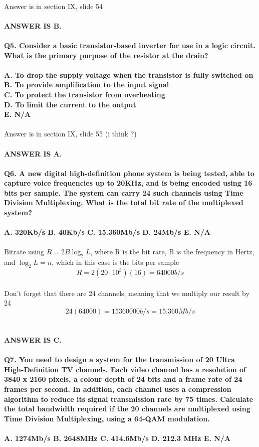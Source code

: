 \documentclass[12pt]{article}
\begin{document}
\\
Answer is in section IX, slide 54\\
\\
\textbf{ANSWER IS B.}\\
\\
\textbf{Q5. Consider a basic transistor-based inverter for use in a logic circuit. What is the primary purpose of the resistor at the drain?\\
\\
A. To drop the supply voltage when the transistor is fully switched on\\
B. To provide amplification to the input signal\\
C. To protect the transistor from overheating\\
D. To limit the current to the output\\
E. N/A}\\
\\
Answer is in section IX, slide 55 (i think ?)\\
\\
\textbf{ANSWER IS A.}\\
\\
\textbf{Q6. A new digital high-definition phone system is being tested, able to capture voice frequencies up to 20KHz, and is being encoded using 16 bits per sample. The system can carry 24 such channels using Time Division Multiplexing. What is the total bit rate of the multiplexed system?\\
\\
A. 320Kb/s B. 40Kb/s C. 15.360Mb/s D. 24Mb/s E. N/A}\\
\\
Bitrate using \(R = 2B\log_2L\), where R is the bit rate, B is the frequency in Hertz, and \(\log_2L = n\), which in this case is the bits per sample\\
\[R = 2(20 \cdot 10^3)(16) = 64000b/s\]\\
Don't forget that there are 24 channels, meaning that we multiply our result by 24\\
\[24(64000) = 15360000 b/s = 15.360Mb/s\]\\
\\
\textbf{ANSWER IS C.}\\
\\
\textbf{Q7. You need to design a system for the transmission of 20 Ultra High-Definition TV channels. Each video channel has a resolution of 3840 x 2160 pixels, a colour depth of 24 bits and a frame rate of 24 frames per second. In addition, each channel uses a compression algorithm to reduce its signal transmission rate by 75 times. Calculate the total bandwidth required if the 20 channels are multiplexed using Time Division Multiplexing, using a 64-QAM modulation.\\
\\
A. 1274Mb/s B. 2648MHz C. 414.6Mb/s D. 212.3 MHz E. N/A}\\
\end{document}
